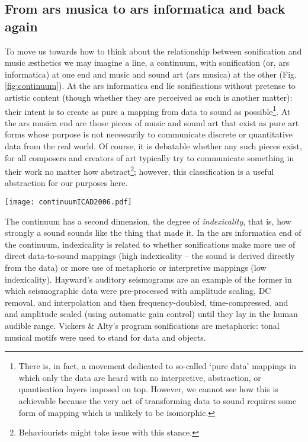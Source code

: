 \documentclass{article}
\begin{document}
\subsection{From ars musica to ars informatica and back again}
To move us towards how to think about the relationship between sonification and music æsthetics we may imagine a line, a continuum, with sonification (or, ars informatica) at one end and music and sound art (ars musica) at the other (Fig. \ref{fig:continuum}). At the ars informatica end lie sonifications without pretense to artistic content (though whether they are perceived as such is another matter): their intent is to create as pure a mapping from data to sound as possible\footnote{There is, in fact, a movement dedicated to so-called `pure data' mappings in which only the data are heard with no interpretive, abstraction, or quantisation layers imposed on top. However, we cannot see how this is achievable because the very act of transforming data to sound requires some form of mapping which is unlikely to be isomorphic.}.
At the ars musica end are those pieces of music and sound art that exist as pure art forms whose purpose is not necessarily to communicate discrete or quantitative data from the real world. Of course, it is debatable whether any such pieces exist, for all composers and creators of art typically try to communicate something in their work no matter how abstract\footnote{Behaviourists might take issue with this stance.}; however, this classification is a useful abstraction for our purposes here.
\begin{figure*}[hbt] 
\centering
\texttt{[image: continuumICAD2006.pdf]} 
\caption[hello]{{\it An Ars Informatica--Ars Musica Continuum}}   
\label{fig:continuum} 
\end{figure*} 

The continuum has a second dimension, the degree of \textit{indexicality}, that is, how strongly a sound sounds like the thing that made it. In the ars informatica end of the continuum, indexicality is related to whether sonifications make more use of direct data-to-sound mappings (high indexicality -- the sound is derived directly from the data) or more use of metaphoric or interpretive mappings (low indexicality). Hayward's auditory seismograms are an example of the former in which seismographic data were pre-processed with amplitude scaling, DC removal, and interpolation and then frequency-doubled, time-compressed, and and amplitude scaled (using automatic gain control) until they lay in the human audible range. Vickers \& Alty's program sonifications are metaphoric: tonal musical motifs were used to stand for data and objects. 
\end{document}
